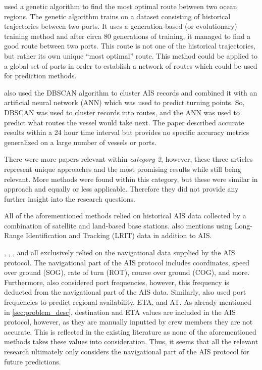 \cite{Pelizzari2016GeneticAF} used a genetic algorithm to find the most optimal route between two ocean regions. The genetic algorithm trains on a dataset consisting of historical trajectories between two ports. It uses a generation-based (or evolutionary) training method and after circa 80 generations of training, it managed to find a good route between two ports. This route is not one of the historical trajectories, but rather its own unique “most optimal” route. This method could be applied to a global set of ports in order to establish a network of routes which could be used for prediction methods.


\cite{Daranda2016NeuralNA} also used the DBSCAN algorithm to cluster AIS records and combined it with an artificial neural network (ANN) which was used to predict turning points. So, DBSCAN was used to cluster records into routes, and the ANN was used to predict what routes the vessel would take next. The paper described accurate results within a 24 hour time interval but provides no specific accuracy metrics generalized on a large number of vessels or ports.

There were more papers relevant within \textit{category 2}, however, these three articles represent unique approaches and the most promising results while still being relevant. More methods were found within this category, but these were similar in approach and equally or less applicable. Therefore they did not provide any further insight into the research questions.



All of the aforementioned methods relied on historical AIS data collected by a combination of satellite and land-based base stations. \cite{Pelizzari2016GeneticAF} also mentions using Long-Range Identification and Tracking (LRIT) data in addition to AIS.


\cite{Daranda2016NeuralNA}, \cite{Pelizzari2016GeneticAF}, \cite{pallotta}, and \cite{Zhang2020AISApproach} all exclusively relied on the navigational data supplied by the AIS protocol. The navigational part of the AIS protocol includes coordinates, speed over ground (SOG), rate of turn (ROT), course over ground (COG), and more. Furthermore, \cite{Zhang2020AISApproach} also considered port frequencies, however, this frequency is deducted from the navigational part of the AIS data. Similarly, \cite{lechtenberg2019} also used port frequencies to predict regional availability, ETA, and AT. As already mentioned in \cref{sec:problem_desc}, destination and ETA values are included in the AIS protocol, however, as they are manually inputted by crew members they are not accurate. This is reflected in the existing literature as none of the aforementioned methods takes these values into consideration. Thus, it seems that all the relevant research ultimately only considers the navigational part of the AIS protocol for future predictions.

